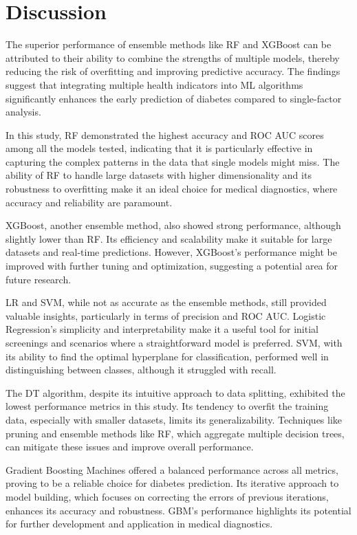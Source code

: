 \section{Discussion}
The superior performance of ensemble methods like RF and XGBoost can be attributed to their ability to combine the strengths of multiple models, thereby reducing the risk of overfitting and improving predictive accuracy. The findings suggest that integrating multiple health indicators into ML algorithms significantly enhances the early prediction of diabetes compared to single-factor analysis.

In this study, RF demonstrated the highest accuracy and ROC AUC scores among all the models tested, indicating that it is particularly effective in capturing the complex patterns in the data that single models might miss. The ability of RF to handle large datasets with higher dimensionality and its robustness to overfitting make it an ideal choice for medical diagnostics, where accuracy and reliability are paramount.

XGBoost, another ensemble method, also showed strong performance, although slightly lower than RF. Its efficiency and scalability make it suitable for large datasets and real-time predictions. However, XGBoost’s performance might be improved with further tuning and optimization, suggesting a potential area for future research.

LR and SVM, while not as accurate as the ensemble methods, still provided valuable insights, particularly in terms of precision and ROC AUC. Logistic Regression’s simplicity and interpretability make it a useful tool for initial screenings and scenarios where a straightforward model is preferred. SVM, with its ability to find the optimal hyperplane for classification, performed well in distinguishing between classes, although it struggled with recall.

The DT algorithm, despite its intuitive approach to data splitting, exhibited the lowest performance metrics in this study. Its tendency to overfit the training data, especially with smaller datasets, limits its generalizability. Techniques like pruning and ensemble methods like RF, which aggregate multiple decision trees, can mitigate these issues and improve overall performance.

Gradient Boosting Machines offered a balanced performance across all metrics, proving to be a reliable choice for diabetes prediction. Its iterative approach to model building, which focuses on correcting the errors of previous iterations, enhances its accuracy and robustness. GBM’s performance highlights its potential for further development and application in medical diagnostics.

